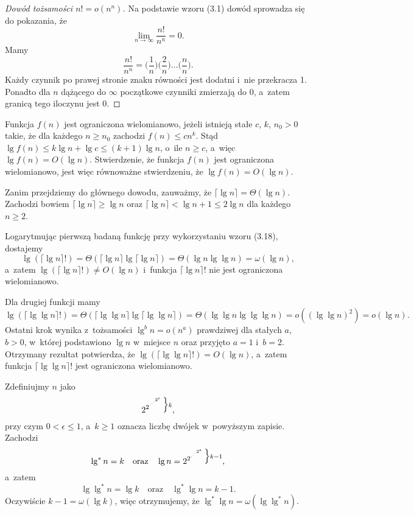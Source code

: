 \begin{proof}[Dowód tożsamości $n!=o(n^n)$]
	Na podstawie wzoru (3.1) dowód sprowadza się do pokazania, że
	\[
		\lim_{n\to\infty}\frac{n!}{n^n} = 0.
	\]
	Mamy
	\[
	    \frac{n!}{n^n} = \biggl(\frac{1}{n}\biggr)\biggl(\frac{2}{n}\biggr)\dots\biggl(\frac{n}{n}\biggr).
	\]
	Każdy czynnik po prawej stronie znaku równości jest dodatni i~nie przekracza 1.
Ponadto dla $n$ dążącego do $\infty$ początkowe czynniki zmierzają do 0, a~zatem granicą tego iloczynu jest 0.
\end{proof}

\exercise %
Funkcja $f(n)$ jest ograniczona wielomianowo, jeżeli istnieją stałe $c$, $k$, $n_0>0$ takie, że dla każdego $n\ge n_0$ zachodzi $f(n)\le cn^k$.
Stąd $\lg f(n)\le k\lg n+\lg c\le(k+1)\lg n$, o~ile $n\ge c$, a~więc $\lg f(n)=O(\lg n)$.
Stwierdzenie, że funkcja $f(n)$ jest ograniczona wielomianowo, jest więc równoważne stwierdzeniu, że $\lg f(n)=O(\lg n)$.

Zanim przejdziemy do głównego dowodu, zauważmy, że $\lceil\lg n\rceil=\Theta(\lg n)$.
Zachodzi bowiem $\lceil\lg n\rceil\ge\lg n$ oraz $\lceil\lg n\rceil<\lg n+1\le2\lg n$ dla każdego $n\ge2$.

Logarytmując pierwszą badaną funkcję przy wykorzystaniu wzoru (3.18), dostajemy
\[
	\lg(\lceil\lg n\rceil!) = \Theta(\lceil\lg n\rceil\lg\lceil\lg n\rceil) = \Theta(\lg n\lg\lg n) = \omega(\lg n),
\]
a~zatem $\lg(\lceil\lg n\rceil!)\ne O(\lg n)$ i~funkcja $\lceil\lg n\rceil!$ nie jest ograniczona wielomianowo.

Dla drugiej funkcji mamy
\[
	\lg(\lceil\lg\lg n\rceil!) = \Theta(\lceil\lg\lg n\rceil\lg\lceil\lg\lg n\rceil) = \Theta(\lg\lg n\lg\lg\lg n) = o((\lg\lg n)^2) = o(\lg n).
\]
Ostatni krok wynika z~tożsamości $\lg^bn=o(n^a)$ prawdziwej dla stałych $a$, $b>0$, w~której podstawiono $\lg n$ w~miejsce $n$ oraz przyjęto $a=1$ i~$b=2$.
Otrzymany rezultat potwierdza, że $\lg(\lceil\lg\lg n\rceil!)=O(\lg n)$, a~zatem funkcja $\lceil\lg\lg n\rceil!$ jest ograniczona wielomianowo.

\exercise %
Zdefiniujmy $n$ jako
\[
    2^{2^{\cdot^{\cdot^{\cdot^{2^\epsilon}}}}}\vbox{\hbox{$\Big\}\scriptstyle k$}\kern0pt},
\]
przy czym $0<\epsilon\le1$, a~$k\ge1$ oznacza liczbę dwójek w~powyższym zapisie.
Zachodzi
\[
    \lg^*n=k \quad\text{oraz}\quad \lg n = 2^{2^{\cdot^{\cdot^{\cdot^{2^\epsilon}}}}}\vbox{\hbox{$\Big\}\scriptstyle k-1$}\kern0pt},
\]
a~zatem
\[
    \lg\lg^*n = \lg k \quad\text{oraz}\quad \lg^*\lg n = k-1.
\]
Oczywiście $k-1=\omega(\lg k)$, więc otrzymujemy, że $\lg^*\lg n=\omega(\lg\lg^*n)$.

